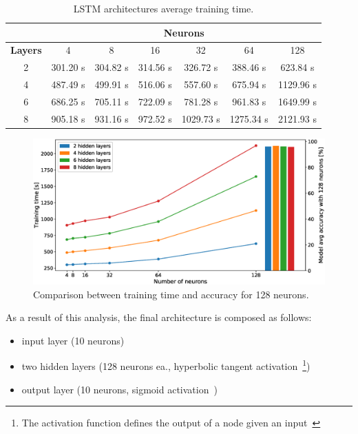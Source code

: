 \begin{table}[]
\centering
\begin{tabular}{|c|c|c|c|c|c|c|}
\hline
 & \multicolumn{6}{c|}{\textbf{Neurons}} \\ \hline
\textbf{Layers} & 4 & 8 & 16 & 32 & 64 & 128 \\ \hline
2 & 301.20 s & 304.82 s & 314.56 s & 326.72 s & 388.46 s & 623.84 s \\ \hline
4 & 487.49 s & 499.91 s & 516.06 s & 557.60 s & 675.94 s & 1129.96 s \\ \hline
6 & 686.25 s & 705.11 s & 722.09  s & 781.28 s & 961.83 s & 1649.99 s \\ \hline
8 & 905.18 s & 931.16 s & 972.52 s & 1029.73 s & 1275.34 s & 2121.93 s \\ \hline
\end{tabular}
\caption{LSTM architectures average training time.}
\label{tab:arch_timing}
\end{table}

\begin{figure}[]
\centering
\includegraphics[width=	\textwidth]{img/timing_cmp.eps}
\caption{Comparison between training time and accuracy for 128 neurons.	}
\label{fig:timing_cmp}
\end{figure}

As a result of this analysis, the final architecture is composed as follows:
\begin{itemize}
\item input layer (10 neurons)
\item two hidden layers (128 neurons ea., hyperbolic tangent activation~\footnote{\label{fn:activation_fun}The activation function defines the output of a node given an input~\cite{Goodfellow-et-al-2016}})
\item output layer (10 neurons, sigmoid activation~)
\end{itemize}

